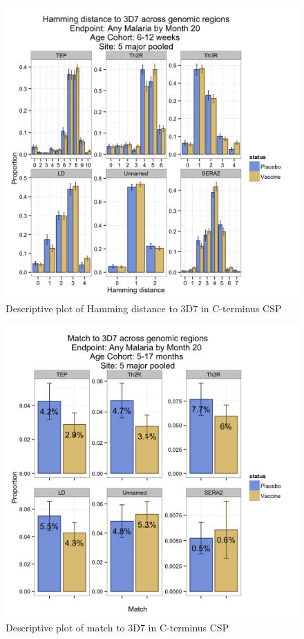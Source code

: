 \documentclass[]{article}
\begin{document}
\begin{figure}[htbp]
\centering
\includegraphics{figures/hamming-newborn-x-1.png}
\caption{Descriptive plot of Hamming distance to 3D7 in C-terminus CSP}
\end{figure}

\begin{figure}[htbp]
\centering
\includegraphics{figures/match-infant-x-1.png}
\caption{Descriptive plot of match to 3D7 in C-terminus CSP}
\end{figure}
\end{document}
